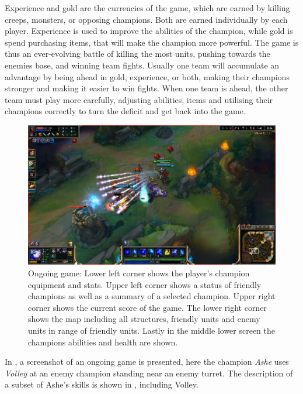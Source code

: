 Experience and gold are the currencies of the game, which are earned by killing creeps, monsters, or opposing champions. Both are earned individually by each player. Experience is used to improve the abilities of the champion, while gold is spend purchasing items, that will make the champion more powerful. The game is thus an ever-evolving battle of killing the most units, pushing towards the enemies base, and winning team fights. Usually one team will accumulate an advantage by being ahead in gold, experience, or both, making their champions stronger and making it easier to win fights. When one team is ahead, the other team must play more carefully, adjusting abilities, items and utilising their champions correctly to turn the deficit and get back into the game.

\begin{figure}[!htb]
  \centering
    \includegraphics[width=1\textwidth]{img/lolgame.png}
  \caption{Ongoing game: Lower left corner shows the player's champion equipment and stats. Upper left corner shows a status of friendly champions as well as a summary of a selected champion. Upper right corner shows the current score of the game. The lower right corner shows the map including all structures, friendly units and enemy units in range of friendly units. Lastly in the middle lower screen the champions abilities and health are shown.}\label{fig:lolgame}
\end{figure}

In , a screenshot of an ongoing game is presented, here the champion \emph{Ashe} uses \emph{Volley} at an enemy champion standing near an enemy turret. The description of a subset of Ashe's skills is shown in , including Volley.

